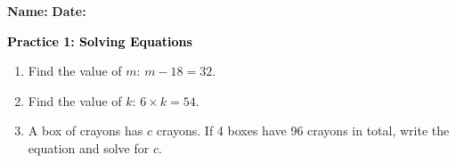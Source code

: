 \documentclass[12pt, letterpaper, fleqn]{article}
\begin{document}
\textbf{Name:} \underline{\hspace{5cm}}
\hfill
\textbf{Date:} \underline{\hspace{3cm}}\\

\begin{tcolorbox}[colback=customteal!20]
    \large\textcolor{black}{\textbf{Practice 1: Solving Equations}}
\end{tcolorbox}
\begin{enumerate}[itemsep=3.5cm, leftmargin=0.6cm]
\item Find the value of $m$: $m - 18 = 32$.
\vspace{3cm}
\item Find the value of $k$: $6 \times k = 54$.
\vspace{3cm}
\item A box of crayons has $c$ crayons. If 4 boxes have 96 crayons in total, write the equation and solve for $c$.
\end{enumerate}
\end{document}
